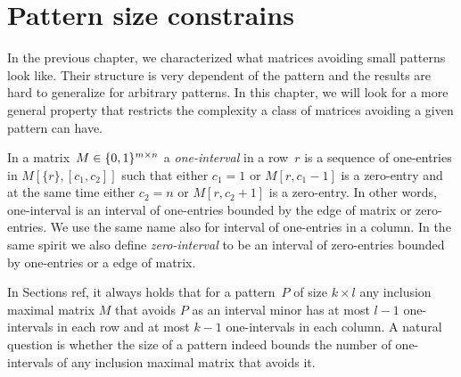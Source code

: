 \chapter{Pattern size constrains}
In the previous chapter, we characterized what matrices avoiding small patterns look like. Their structure is very dependent of the pattern and the results are hard to generalize for arbitrary patterns. In this chapter, we will look for a more general property that restricts the complexity a class of matrices avoiding a given pattern can have.
\begin{defn}
In a matrix~$M\in\{0,1\}^{m\times n}$ a \emph{one-interval} in a row~$r$ is a sequence of one-entries in $M[\{r\},[c_1,c_2]]$ such that either $c_1=1$ or $M[r,c_1-1]$ is a zero-entry and at the same time either $c_2=n$ or $M[r,c_2+1]$ is a zero-entry. In other words, one-interval is an interval of one-entries bounded by the edge of matrix or zero-entries. We use the same name also for interval of one-entries in a column. In the same spirit we also define \emph{zero-interval} to be an interval of zero-entries bounded by one-entries or a edge of matrix.
\end{defn}
In Sections ref, it always holds that for a pattern~$P$ of size $k\times l$ any inclusion maximal matrix $M$ that avoids $P$ as an interval minor has at most $l-1$ one-intervals in each row and at most $k-1$ one-intervals in each column. A natural question is whether the size of a pattern indeed bounds the number of one-intervals of any inclusion maximal matrix that avoids it.

